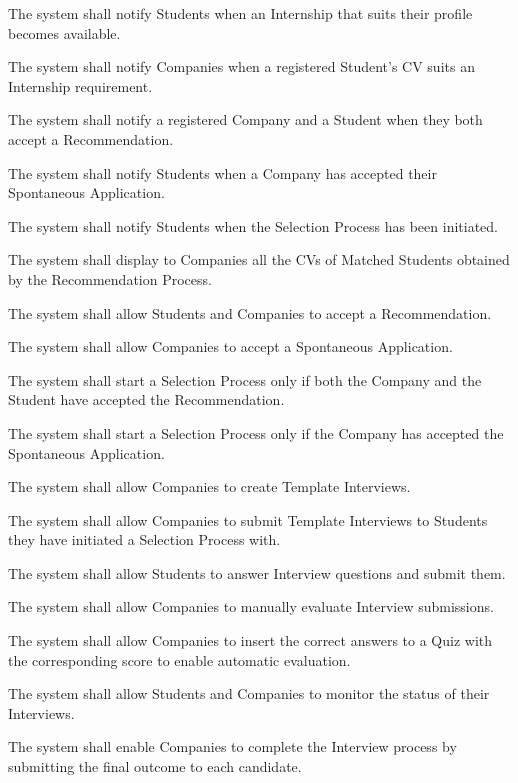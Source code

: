 \begin{enumerate}[label={\color{titleColor}[R\arabic*]}]
    \item The system shall notify Students when an Internship that suits their profile becomes available.
    \item The system shall notify Companies when a registered Student’s CV suits an Internship requirement.
    \item The system shall notify a registered Company and a Student when they both accept a Recommendation.
    \item The system shall notify Students when a Company has accepted their Spontaneous Application.
    \item The system shall notify Students when the Selection Process has been initiated.
    \item The system shall display to Companies all the CVs of Matched Students obtained by the Recommendation Process.
    \item The system shall allow Students and Companies to accept a Recommendation.
    \item The system shall allow Companies to accept a Spontaneous Application.
    \item The system shall start a Selection Process only if both the Company and the Student have accepted the Recommendation.
    \item The system shall start a Selection Process only if the Company has accepted the Spontaneous Application.

    \item The system shall allow Companies to create Template Interviews.
    \item The system shall allow Companies to submit Template Interviews to Students they have initiated a Selection Process with.
    \item The system shall allow Students to answer Interview questions and submit them.
    \item The system shall allow Companies to manually evaluate Interview submissions.
    \item The system shall allow Companies to insert the correct answers to a Quiz with the corresponding score to enable automatic evaluation.
    \item The system shall allow Students and Companies to monitor the status of their Interviews.
    \item The system shall enable Companies to complete the Interview process by submitting the final outcome to each candidate.


\end{enumerate}
